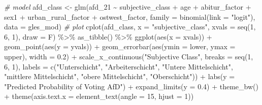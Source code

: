 \documentclass[
]{article}
\newenvironment{Shaded}{\begin{snugshade}}{\end{snugshade}}
\newcommand{\AttributeTok}[1]{\textcolor[rgb]{0.77,0.63,0.00}{#1}}
\newcommand{\CommentTok}[1]{\textcolor[rgb]{0.56,0.35,0.01}{\textit{#1}}}
\newcommand{\DecValTok}[1]{\textcolor[rgb]{0.00,0.00,0.81}{#1}}
\newcommand{\FloatTok}[1]{\textcolor[rgb]{0.00,0.00,0.81}{#1}}
\newcommand{\FunctionTok}[1]{\textcolor[rgb]{0.00,0.00,0.00}{#1}}
\newcommand{\NormalTok}[1]{#1}
\newcommand{\OtherTok}[1]{\textcolor[rgb]{0.56,0.35,0.01}{#1}}
\newcommand{\SpecialCharTok}[1]{\textcolor[rgb]{0.00,0.00,0.00}{#1}}
\newcommand{\StringTok}[1]{\textcolor[rgb]{0.31,0.60,0.02}{#1}}
\begin{document}
\begin{Shaded}
\begin{Highlighting}[]
\CommentTok{\# model}
\NormalTok{afd\_class }\OtherTok{\textless{}{-}} \FunctionTok{glm}\NormalTok{(afd\_21 }\SpecialCharTok{\textasciitilde{}}\NormalTok{ subjective\_class }\SpecialCharTok{+}\NormalTok{ age }\SpecialCharTok{+}\NormalTok{ abitur\_factor }\SpecialCharTok{+}\NormalTok{ sex1 }\SpecialCharTok{+}\NormalTok{ urban\_rural\_factor }\SpecialCharTok{+}\NormalTok{ ostwest\_factor, }\AttributeTok{family =} \FunctionTok{binomial}\NormalTok{(}\AttributeTok{link =} \StringTok{"logit"}\NormalTok{), }\AttributeTok{data =}\NormalTok{ gles\_mod)}
\CommentTok{\# plot}
\FunctionTok{cplot}\NormalTok{(afd\_class, }\AttributeTok{x =} \StringTok{"subjective\_class"}\NormalTok{, }
      \AttributeTok{xvals =} \FunctionTok{seq}\NormalTok{(}\DecValTok{1}\NormalTok{, }\DecValTok{6}\NormalTok{, }\DecValTok{1}\NormalTok{), }\AttributeTok{draw =}\NormalTok{ F) }\SpecialCharTok{\%\textgreater{}\%}
  \FunctionTok{as\_tibble}\NormalTok{() }\SpecialCharTok{\%\textgreater{}\%}
  \FunctionTok{ggplot}\NormalTok{(}\FunctionTok{aes}\NormalTok{(}\AttributeTok{x =}\NormalTok{ xvals)) }\SpecialCharTok{+}
  \FunctionTok{geom\_point}\NormalTok{(}\FunctionTok{aes}\NormalTok{(}\AttributeTok{y =}\NormalTok{ yvals)) }\SpecialCharTok{+}
  \FunctionTok{geom\_errorbar}\NormalTok{(}\FunctionTok{aes}\NormalTok{(}\AttributeTok{ymin =}\NormalTok{ lower, }\AttributeTok{ymax =}\NormalTok{ upper), }\AttributeTok{width =} \FloatTok{0.2}\NormalTok{) }\SpecialCharTok{+}
  \FunctionTok{scale\_x\_continuous}\NormalTok{(}\StringTok{"Subjective Class"}\NormalTok{, }
                     \AttributeTok{breaks =} \FunctionTok{seq}\NormalTok{(}\DecValTok{1}\NormalTok{, }\DecValTok{6}\NormalTok{, }\DecValTok{1}\NormalTok{), }
                     \AttributeTok{labels =} \FunctionTok{c}\NormalTok{(}\StringTok{"Unterschicht"}\NormalTok{, }\StringTok{"Arbeiterschicht"}\NormalTok{, }
                                \StringTok{"Untere Mittelschicht"}\NormalTok{, }\StringTok{"mittlere Mittelschicht"}\NormalTok{, }\StringTok{"obere Mittelschicht"}\NormalTok{, }\StringTok{"Oberschicht"}\NormalTok{)) }\SpecialCharTok{+}
  \FunctionTok{labs}\NormalTok{(}\AttributeTok{y =} \StringTok{"Predicted Probability of Voting AfD"}\NormalTok{) }\SpecialCharTok{+}
  \FunctionTok{expand\_limits}\NormalTok{(}\AttributeTok{y =} \FloatTok{0.4}\NormalTok{) }\SpecialCharTok{+}
  \FunctionTok{theme\_bw}\NormalTok{() }\SpecialCharTok{+}
  \FunctionTok{theme}\NormalTok{(}\AttributeTok{axis.text.x =} \FunctionTok{element\_text}\NormalTok{(}\AttributeTok{angle =} \DecValTok{15}\NormalTok{, }\AttributeTok{hjust =} \DecValTok{1}\NormalTok{))}
\end{Highlighting}
\end{Shaded}
\end{document}
